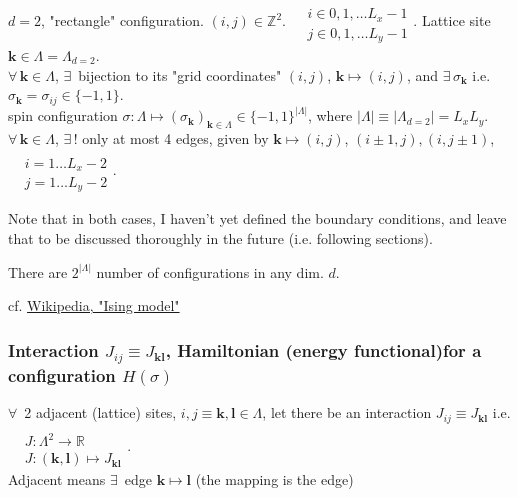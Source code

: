 $d=2$, "rectangle" configuration.  $(i,j) \in \mathbb{Z}^2$.   $\begin{aligned} & \quad \\ 
&	 i \in 0,1,\dots L_x-1 \\ 
&	 j \in 0,1,\dots L_y-1 \end{aligned}$.  Lattice site $\mathbf{k} \in \Lambda = \Lambda_{d=2}$.  \\ $\forall \, \mathbf{k} \in \Lambda$, $\exists \, $ bijection to its "grid coordinates" $(i,j)$, $\mathbf{k} \mapsto (i,j)$, and $\exists \, \sigma_{\mathbf{k}} $ i.e. $\sigma_{\mathbf{k}} = \sigma_{ij} \in \lbrace -1,1\rbrace$.  \\
spin configuration $\sigma: \Lambda \mapsto (\sigma_{\mathbf{k}})_{\mathbf{k} \in \Lambda} \in \lbrace -1,1\rbrace^{|\Lambda|}$, where $|\Lambda | \equiv |\Lambda_{d=2} | = L_xL_y$.  \\
$\forall \, \mathbf{k} \in \Lambda$, $\exists \, !$ only at most 4 edges, given by $\mathbf{k} \mapsto (i,j)$, $(i \pm 1, j ), (i,j\pm 1)$, \  $\begin{aligned} & \quad \\ & i = 1\dots L_x -2 \\ & j = 1\dots L_y-2 \end{aligned}$.  

Note that in both cases, I haven't yet defined the boundary conditions, and leave that to be discussed thoroughly in the future (i.e. following sections).  

There are $2^{|\Lambda|}$ number of configurations in any dim. $d$.  

cf. \href{https://en.wikipedia.org/wiki/Ising_model}{Wikipedia, "Ising model"}

\subsubsection{Interaction $J_{ij} \equiv J_{\mathbf{k} \mathbf{l}}$, Hamiltonian (energy functional)for a configuration $H(\sigma)$}  

$\forall \, $ 2 adjacent (lattice) sites, $i,j \equiv \mathbf{k}, \mathbf{l} \in \Lambda$, let there be an interaction $J_{ij} \equiv J_{\mathbf{k} \mathbf{l}}$ i.e. $\begin{aligned} & \quad \\ 
& J : \Lambda^2 \to \mathbb{R} \\ 
& J: (\mathbf{k}, \mathbf{l}) \mapsto J_{\mathbf{k} \mathbf{l}} \end{aligned}$.   \\
Adjacent means $\exists \, $ edge $\mathbf{k} \mapsto \mathbf{l}$ (the mapping is the edge)  

